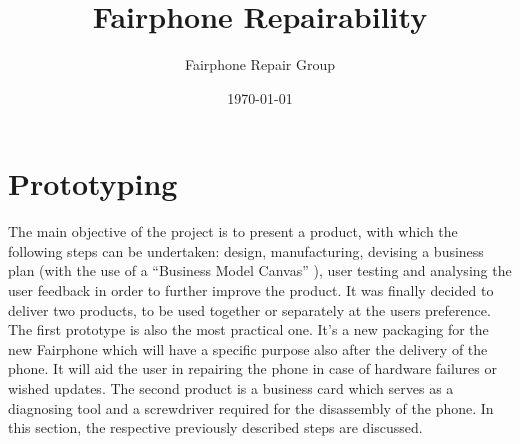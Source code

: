 \documentclass[final,a4paper]{report} %
\author{Fairphone Repair Group}
\title{Fairphone Repairability}
\date{\today}
\begin{document}
\chapter{Prototyping}
	The main objective of the project is to present a product, with which the following steps can be undertaken: design, manufacturing, devising a business plan (with the use of a ``Business Model Canvas'' \cite{BusinessCanvas}), user testing and analysing the user feedback in order to further improve the product. It was finally decided to deliver two products, to be used together or separately at the users preference. The first prototype is also the most practical one. It's a new packaging for the new Fairphone which will have a specific purpose also after the delivery of the phone. It will aid the user in repairing the phone in case of hardware failures or wished updates. The second product is a business card which serves as a diagnosing tool and a screwdriver required for the disassembly of the phone. In this section, the respective previously described steps are discussed.
\end{document}
